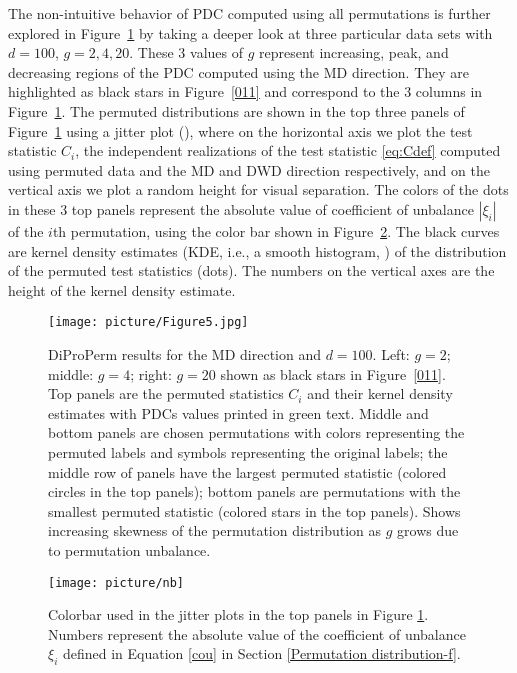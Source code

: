 \documentclass[12pt]{article}
\begin{document}
{The non-intuitive behavior of PDC computed using all permutations is further explored in Figure~\ref{012} by taking a deeper look at three particular data sets with $d=100$, $g=2,4,20$. These 3 values of $g$ represent increasing, peak, and decreasing regions of the PDC computed using the MD direction. They are highlighted as black stars in Figure~\ref{011} and correspond to the  3 columns in Figure~\ref{012}. The permuted distributions are shown in the top three panels of Figure~\ref{012} using a jitter plot (\citet{tukey1976exploratory}), where on the horizontal axis we plot the test statistic $C_i$, the independent realizations of the test statistic \eqref{eq:Cdef} computed using permuted data and the MD and DWD direction respectively, and on the vertical axis we plot a random height for visual separation.  The colors of the dots in these 3 top panels represent the absolute value of coefficient of unbalance $|\xi_i|$ of the $i$th permutation, using the color bar shown in Figure~\ref{000}.  The black curves are kernel density estimates (KDE, i.e., a smooth histogram, \citet{wand1994kernel}) of the distribution of the permuted test statistics (dots). The numbers on the vertical axes are the height of the kernel density estimate.
\begin{figure}[H]
  \centering
  \texttt{[image: picture/Figure5.jpg]}\\
  \caption{DiProPerm results for the MD direction and $d=100$. Left: $g=2$; middle: $g=4$; right: $g=20$ shown as black stars in Figure~\ref{011}. Top panels are the permuted statistics $C_i$ and their kernel density estimates with PDCs values printed in green text. Middle and bottom panels are chosen permutations with colors representing the permuted labels and symbols representing the original labels; the middle row of panels have the largest permuted statistic (colored circles in the top panels); bottom panels are permutations with the smallest permuted statistic (colored stars in the top panels). Shows increasing skewness of the permutation distribution as $g$ grows due to permutation unbalance.}
  \label{012}
\end{figure}
\begin{figure}[H]
  \centering
  \texttt{[image: picture/nb]}\\
  \caption{Colorbar used in the jitter plots in the top panels in Figure \ref{012}. Numbers represent the absolute value of the coefficient of unbalance $\xi_i$ defined in Equation \eqref{cou} in Section \ref{Permutation distribution-f}.}
  \label{000}
\end{figure}

}
\end{document}

